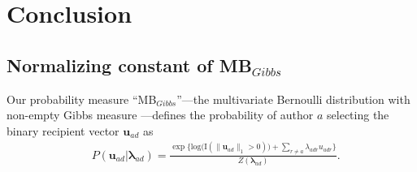 \documentclass[12pt]{article}
\begin{document}
\section{Conclusion}\label{sec:conclusion}
\newpage


\begin{appendices}
\section{Normalizing constant of MB$_{Gibbs}$}\label{sec: non-empty Gibbs measure}
Our probability measure ``MB$_{Gibbs}$''---the multivariate Bernoulli distribution with non-empty Gibbs measure \citep{fellows2017removing}---defines the probability of author $a$ selecting the binary recipient vector $\boldsymbol{u}_{ad}$ as
\begin{equation*} 
\begin{aligned}
& P(\boldsymbol{u}_{ad}|\boldsymbol{\lambda}_{ad} ) = \frac{\exp\Big\{ \mbox{log}\big(\text{I}(\lVert \boldsymbol{u}_{ad} \rVert_1 > 0)\big) + \sum_{r \neq a} \lambda_{adr}u_{adr} \Big\}}{Z(\boldsymbol{\lambda}_{ad})}.
\end{aligned}
\end{equation*}


\end{appendices}
\end{document}

